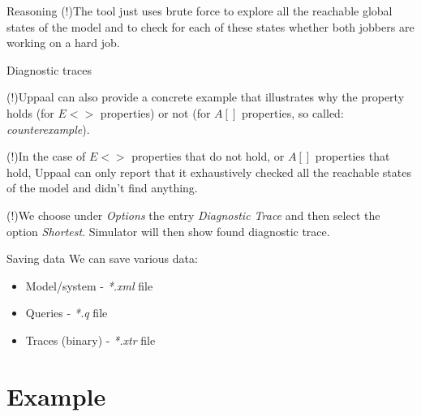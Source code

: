 \documentclass{beamer}
\begin{document}
\begin{frame}{Reasoning}
	(!)The tool just uses brute force to explore all the reachable global states of the model and to check for each of these	states whether both jobbers are working on a hard job.
\end{frame}

\begin{frame}{Diagnostic traces}
	
	(!)Uppaal can also provide a concrete example that illustrates why the property holds (for $E<>$ properties) or not (for $A[]$ properties, so called: \textit{counterexample}).\newline
	
	(!)In the case of $E<>$ properties that do not hold, or $A[]$ properties that hold, Uppaal can only report that it exhaustively checked all the reachable states of the model and didn’t find anything.\newline
	
	(!)We choose under \textit{Options} the entry \textit{Diagnostic Trace} and then select the option \textit{Shortest}. Simulator will then show found diagnostic trace.
\end{frame}

\begin{frame}{Saving data}
	We can save various data:
	
	\begin{itemize}
		\item Model/system - \textit{*.xml} file
		\item Queries - \textit{*.q} file
		\item Traces (binary) - \textit{*.xtr} file
	\end{itemize}
\end{frame}

\section{Example}
\end{document}
